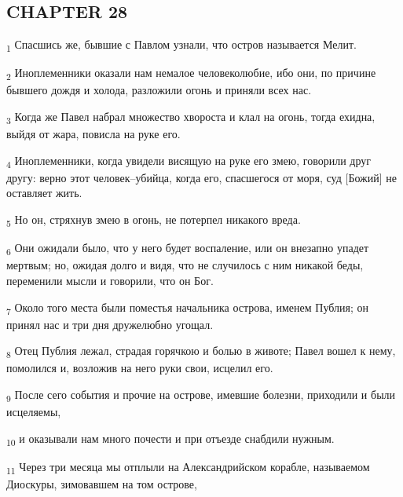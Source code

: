 \subsection{CHAPTER 28}
\begin{tcolorbox}
\textsubscript{1} Спасшись же, бывшие с Павлом узнали, что остров называется Мелит.
\end{tcolorbox}
\begin{tcolorbox}
\textsubscript{2} Иноплеменники оказали нам немалое человеколюбие, ибо они, по причине бывшего дождя и холода, разложили огонь и приняли всех нас.
\end{tcolorbox}
\begin{tcolorbox}
\textsubscript{3} Когда же Павел набрал множество хвороста и клал на огонь, тогда ехидна, выйдя от жара, повисла на руке его.
\end{tcolorbox}
\begin{tcolorbox}
\textsubscript{4} Иноплеменники, когда увидели висящую на руке его змею, говорили друг другу: верно этот человек--убийца, когда его, спасшегося от моря, суд [Божий] не оставляет жить.
\end{tcolorbox}
\begin{tcolorbox}
\textsubscript{5} Но он, стряхнув змею в огонь, не потерпел никакого вреда.
\end{tcolorbox}
\begin{tcolorbox}
\textsubscript{6} Они ожидали было, что у него будет воспаление, или он внезапно упадет мертвым; но, ожидая долго и видя, что не случилось с ним никакой беды, переменили мысли и говорили, что он Бог.
\end{tcolorbox}
\begin{tcolorbox}
\textsubscript{7} Около того места были поместья начальника острова, именем Публия; он принял нас и три дня дружелюбно угощал.
\end{tcolorbox}
\begin{tcolorbox}
\textsubscript{8} Отец Публия лежал, страдая горячкою и болью в животе; Павел вошел к нему, помолился и, возложив на него руки свои, исцелил его.
\end{tcolorbox}
\begin{tcolorbox}
\textsubscript{9} После сего события и прочие на острове, имевшие болезни, приходили и были исцеляемы,
\end{tcolorbox}
\begin{tcolorbox}
\textsubscript{10} и оказывали нам много почести и при отъезде снабдили нужным.
\end{tcolorbox}
\begin{tcolorbox}
\textsubscript{11} Через три месяца мы отплыли на Александрийском корабле, называемом Диоскуры, зимовавшем на том острове,
\end{tcolorbox}
